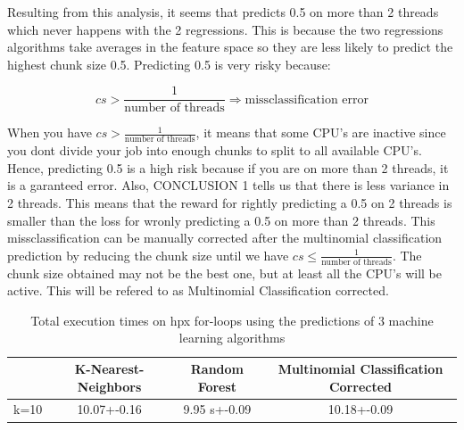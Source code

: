 \documentclass[12pt]{article}
\begin{document}
Resulting from this analysis, it seems that predicts 0.5 on more than 2 threads which never happens with the 2 regressions. This is because the two regressions algorithms take averages in the feature space so they are less likely to predict the highest chunk size 0.5. Predicting 0.5 is very risky because:

$$cs>\frac{1}{\text{number of threads}} \Rightarrow \text{missclassification error}$$

 When you have $cs>\frac{1}{\text{number of threads}}$, it means that some CPU's are inactive since you dont divide your job into enough chunks to split to all available CPU's. Hence, predicting 0.5 is a high risk because if you are on more than 2 threads, it is a garanteed error. Also, CONCLUSION 1 tells us that there is less variance in 2 threads. This means that the reward for rightly predicting a  0.5 on 2 threads is smaller than the loss for wronly predicting a 0.5 on more than 2 threads.
This missclassification can be manually corrected after the multinomial classification prediction by reducing the chunk size until we have $cs\leq \frac{1}{\text{number of threads}}$. The chunk size obtained may not be the best one, but at least all the CPU's will be active. This will be refered to as Multinomial Classification corrected.

\begin{table}[h]
	\centering
	\caption{Total execution times on hpx for-loops using the predictions of 3 machine learning algorithms}
	\label{my-label}
	\begin{tabular}{|c|c|c|c|}
		\hline
		& K-Nearest-Neighbors & Random Forest &Multinomial Classification Corrected\\ \hline
		k=10 & 10.07+-0.16  & 9.95 s+-0.09 & 10.18+-0.09\\ \hline
	\end{tabular}
\end{table}
\end{document}
